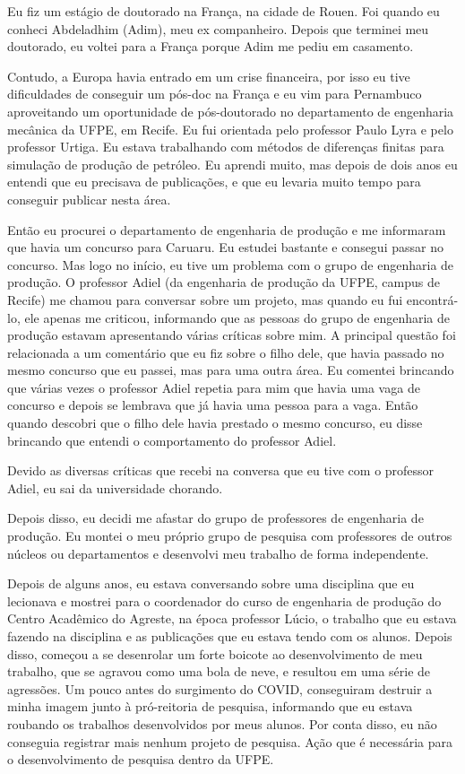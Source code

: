 \documentclass[11pt]{book}
\title{\textbf{Ana} \\ \vskip 1em \small The policy of silencing}
\author{Tatiana Balbi Fraga}
\date{}
\begin{document}
\maketitle

Eu fiz um estágio de doutorado na França, na cidade de Rouen. Foi quando eu conheci Abdeladhim (Adim), meu ex companheiro. Depois que terminei meu doutorado, eu voltei para a França porque Adim me pediu em casamento.

Contudo, a Europa havia entrado em um crise financeira, por isso eu tive dificuldades de conseguir um pós-doc na França e eu vim para Pernambuco aproveitando um oportunidade de pós-doutorado no departamento de engenharia mecânica da UFPE, em Recife. Eu fui orientada pelo professor Paulo Lyra e pelo professor Urtiga. Eu estava trabalhando com métodos de diferenças finitas para simulação de produção de petróleo. Eu aprendi muito, mas depois de dois anos eu entendi que eu precisava de publicações, e que eu levaria muito tempo para conseguir publicar nesta área. 

Então eu procurei o departamento de engenharia de produção e me informaram que havia um concurso para Caruaru. Eu estudei bastante e consegui passar no concurso. Mas logo no início, eu tive um problema com o grupo de engenharia de produção. O professor Adiel (da engenharia de produção da UFPE, campus de Recife) me chamou para conversar sobre um projeto, mas quando eu fui encontrá-lo, ele apenas me criticou, informando que as pessoas do grupo de engenharia de produção estavam apresentando várias críticas sobre mim. A principal questão foi relacionada a um comentário que eu fiz sobre o filho dele, que havia passado no mesmo concurso que eu passei, mas para uma outra área. Eu comentei brincando que várias vezes o professor Adiel repetia para mim que havia uma vaga de concurso e depois se lembrava que já havia uma pessoa para a vaga. Então quando descobri que o filho dele havia prestado o mesmo concurso, eu disse brincando que entendi o comportamento do professor Adiel. 

Devido as diversas críticas que recebi na conversa que eu tive com o professor Adiel, eu sai da universidade chorando. 

Depois disso, eu decidi me afastar do grupo de professores de engenharia de produção. Eu montei o meu próprio grupo de pesquisa com professores de outros núcleos ou departamentos e desenvolvi meu trabalho de forma independente.

Depois de alguns anos, eu estava conversando sobre uma disciplina que eu lecionava e mostrei para o coordenador do curso de engenharia de produção do Centro Acadêmico do Agreste, na época professor Lúcio, o trabalho que eu estava fazendo na disciplina e as publicações que eu estava tendo com os alunos. Depois disso, começou a se desenrolar um forte boicote ao desenvolvimento de meu trabalho, que se agravou como uma bola de neve, e resultou em uma série de agressões. Um pouco antes do surgimento do COVID, conseguiram destruir a minha imagem junto à pró-reitoria de pesquisa, informando que eu estava roubando os trabalhos desenvolvidos por meus alunos. Por conta disso, eu não conseguia registrar mais nenhum projeto de pesquisa. Ação que é necessária para o desenvolvimento de pesquisa dentro da UFPE.
\end{document}

